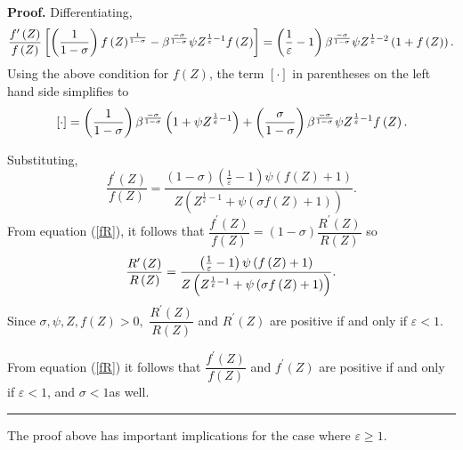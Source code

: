 \documentclass{article}
\newenvironment{proof}[1][Proof]{\noindent\textbf{#1.} }{\ \rule{0.5em}{0.5em}}
\begin{document}
\begin{doublespace}
\begin{proof}
Differentiating,%
\begin{equation*}
\frac{f^{\prime }\left( Z\right) }{f\left( Z\right) }\left[ \left( \frac{1}{%
1-\sigma }\right) f\left( Z\right) ^{\frac{1}{1-\sigma }}-\beta ^{\frac{%
-\sigma }{1-\sigma }}\psi Z^{\frac{1}{\varepsilon }-1}f\left( Z\right) %
\right] =\left( \frac{1}{\varepsilon }-1\right) \beta ^{\frac{-\sigma }{%
1-\sigma }}\psi Z^{\frac{1}{\varepsilon }-2}\left( 1+f\left( Z\right)
\right) .
\end{equation*}%
Using the above condition for $f\left( Z\right) $, the term $\left[ \cdot %
\right] $ in parentheses on the left hand side simplifies to 
\begin{equation*}
\left[ \cdot \right] =\left( \frac{1}{1-\sigma }\right) \beta ^{\frac{%
-\sigma }{1-\sigma }}\left( 1+\psi Z^{\frac{1}{\varepsilon }-1}\right)
+\left( \frac{\sigma }{1-\sigma }\right) \beta ^{\frac{-\sigma }{1-\sigma }%
}\psi Z^{\frac{1}{\varepsilon }-1}f\left( Z\right) .
\end{equation*}

Substituting,%
\begin{equation*}
\frac{f^{\prime }\left( Z\right) }{f\left( Z\right) }=\frac{\left( 1-\sigma
\right) \left( \frac{1}{\varepsilon }-1\right) \psi \left( f\left( Z\right)
+1\right) }{Z\left( Z^{\frac{1}{\varepsilon }-1}+\psi \left( \sigma f\left(
Z\right) +1\right) \right) }.
\end{equation*}%
From equation (\ref{fR}), it follows that $\dfrac{f^{\prime }\left( Z\right) 
}{f\left( Z\right) }=\left( 1-\sigma \right) \dfrac{R^{\prime }\left(
Z\right) }{R\left( Z\right) }$ so%
\begin{equation}
\dfrac{R^{\prime }\left( Z\right) }{R\left( Z\right) }=\frac{\left( \frac{1}{%
\varepsilon }-1\right) \psi \left( f\left( Z\right) +1\right) }{Z\left( Z^{%
\frac{1}{\varepsilon }-1}+\psi \left( \sigma f\left( Z\right) +1\right)
\right) }.  \label{RpR}
\end{equation}%
Since $\sigma ,\psi ,Z,f\left( Z\right) >0,$ $\dfrac{R^{\prime }\left(
Z\right) }{R\left( Z\right) }$ and $R^{\prime }\left( Z\right) $ are
positive if and only if $\varepsilon <1.$ \ 

From equation (\ref{fR}) it follows that $\dfrac{f^{\prime }\left( Z\right) 
}{f\left( Z\right) }$ and $f^{\prime }\left( Z\right) $ are positive if and
only if $\varepsilon <1$, and $\sigma <1$as well.
\end{proof}

The proof above has important implications for the case where $\varepsilon
\geq 1$.\pagebreak


\end{doublespace}
\end{document}
